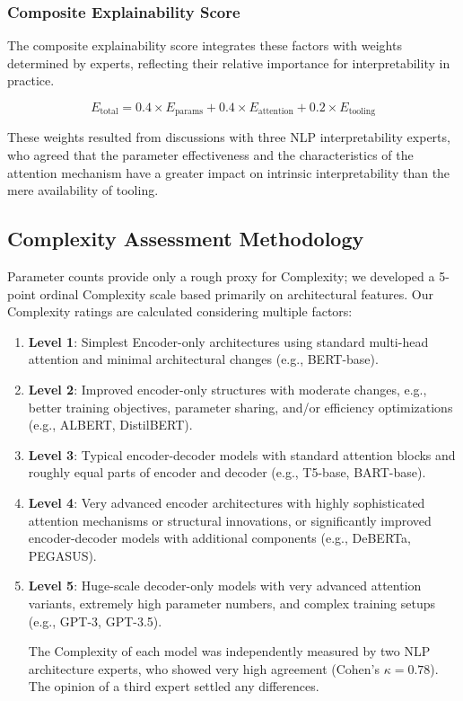 \documentclass[preprint,12pt]{elsarticle}
\begin{document}
\subsubsection{Composite Explainability Score}
The composite explainability score integrates these factors with weights determined by experts, reflecting their relative importance for interpretability in practice.

\[E_{\text{total}} = 0.4 \times E_{\text{params}} + 0.4 \times E_{\text{attention}} + 0.2 \times E_{\text{tooling}}\]

These weights resulted from discussions with three NLP interpretability experts, who agreed that the parameter effectiveness and the characteristics of the attention mechanism have a greater impact on intrinsic interpretability than the mere availability of tooling.

\subsection{Complexity Assessment Methodology}
Parameter counts provide only a rough proxy for Complexity; we developed a 5-point ordinal Complexity scale based primarily on architectural features. Our Complexity ratings are calculated considering multiple factors:

\begin{enumerate}
   \item \textbf{Level 1}: Simplest Encoder-only architectures using standard multi-head attention and minimal architectural changes (e.g., BERT-base).

   \item \textbf{Level 2}: Improved encoder-only structures with moderate changes, e.g., better training objectives, parameter sharing, and/or efficiency optimizations (e.g., ALBERT, DistilBERT).
   
   \item \textbf{Level 3}: Typical encoder-decoder models with standard attention blocks and roughly equal parts of encoder and decoder (e.g., T5-base, BART-base).
   
   \item \textbf{Level 4}: Very advanced encoder architectures with highly sophisticated attention mechanisms or structural innovations, or significantly improved encoder-decoder models with additional components (e.g., DeBERTa, PEGASUS).
   
   \item \textbf{Level 5}: Huge-scale decoder-only models with very advanced attention variants, extremely high parameter numbers, and complex training setups (e.g., GPT-3, GPT-3.5).
   
The Complexity of each model was independently measured by two NLP architecture experts, who showed very high agreement (Cohen's $\kappa = 0.78$). The opinion of a third expert settled any differences.
\end{enumerate}
\end{document}
